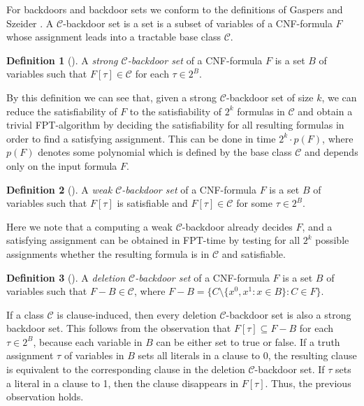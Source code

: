 \documentclass[11pt,a4paper]{article}
\theoremstyle{definition}
\newtheorem{definition}{Definition}[section]
\theoremstyle{proposition}
\begin{document}
For backdoors and backdoor sets we conform to the definitions of Gaspers and Szeider \cite{Gaspers2012}. A $\mathcal{C}$-backdoor set is a set is a subset of variables of a CNF-formula $F$ whose assignment leads into a tractable base class $\mathcal{C}$. 
\begin{definition}[{\cite[p.289f]{Gaspers2012}}]
A \textit{strong $\mathcal{C}$-backdoor set} of a CNF-formula $F$ is a set $B$ of variables such that $F[\tau] \in \mathcal{C}$ for each $\tau \in 2^B$. 
\end{definition}
By this definition we can see that, given a strong $\mathcal{C}$-backdoor set of size $k$, we can reduce the satisfiability of $F$ to the satisfiability of $2^k$ formulas in $\mathcal{C}$ and obtain a trivial FPT-algorithm by deciding the satisfiability for all resulting formulas in order to find a satisfying assignment. This can be done in time $2^k \cdot p(F)$, where $p(F)$ denotes some polynomial which is defined by the base class $\mathcal{C}$ and depends only on the input formula $F$. 
\begin{definition}[{\cite[p.289f]{Gaspers2012}}]
A \textit{weak $\mathcal{C}$-backdoor set} of a CNF-formula $F$ is a set $B$ of variables such that $F[\tau]$ is satisfiable and $F[\tau] \in \mathcal{C}$ for some $\tau \in 2^B$. 
\end{definition}
Here we note that a computing a weak $\mathcal{C}$-backdoor already decides $F$, and a satisfying assignment can be obtained in FPT-time by testing for all $2^k$ possible assignments whether the resulting formula is in $\mathcal{C}$ and satisfiable.  
\begin{definition}[{\cite[p.289f]{Gaspers2012}}]
A \textit{deletion $\mathcal{C}$-backdoor set} of a CNF-formula $F$ is a set $B$ of variables such that $F - B \in \mathcal{C}$, where $F - B = \{C \setminus \{x^0, x^1 \colon x \in B\} \colon C \in F \}$. 
\end{definition}
If a class $\mathcal{C}$ is clause-induced, then every deletion $\mathcal{C}$-backdoor set is also a strong backdoor set. This follows from the observation that $F[\tau] \subseteq F - B$ for each $\tau \in 2^B$, because each variable in $B$ can be either set to true or false. If a truth assignment $\tau$ of variables in $B$ sets all literals in a clause to 0, the resulting clause is equivalent to the corresponding clause in the deletion $\mathcal{C}$-backdoor set. If $\tau$ sets a literal in a clause to 1, then the clause disappears in $F[\tau]$. Thus, the previous observation holds. 
\end{document}
